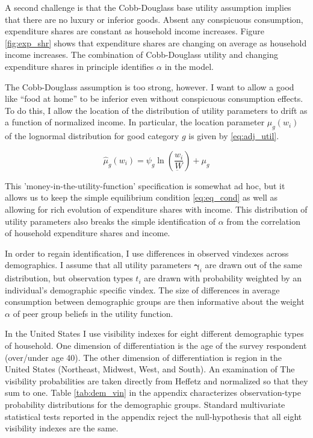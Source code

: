 \documentclass[11pt]{article}
\begin{document}
\begin{CJK}{UTF8}{gbsn}
A second challenge is that the Cobb-Douglass base utility assumption implies that there are no luxury or inferior goods.  Absent any conspicuous consumption, expenditure shares are constant as household  income increases.  Figure \ref{fig:exp_shr} shows that expenditure shares are changing on average as household income increases.  The combination of Cobb-Douglass utility and changing expenditure shares in principle identifies $\alpha$ in the model.

The Cobb-Douglass assumption is too strong, however.  I want to allow a good like ``food at home'' to be inferior even without conspicuous consumption effects.  To do this, I allow the location of the distribution of utility parameters to drift as a function of normalized income.  In particular, the location parameter $\hat{\mu}_g(w_i)$ of the lognormal distribution for good category $g$ is given by \eqref{eq:adj_util}.

\begin{equation}
    \label{eq:adj_util}
    \hat{\mu}_g(w_i) = \psi_g \ln \left(\frac{w_i}{\underbar{W}}\right) + \mu_g
\end{equation}

This 'money-in-the-utility-function' specification is somewhat ad hoc, but it allows us to keep the simple equilibrium condition \eqref{eq:eq_cond} as well as allowing for rich evolution of expenditure shares with income.  This distribution of utility parameters also breaks the simple identification of $\alpha$ from the correlation of household expenditure shares and income.

In order to regain identification, I use differences in observed vindexes across demographics.  I assume that all utility parameters $\boldsymbol{\gamma}_i$ are drawn out of the same distribution, but observation types $t_i$ are drawn with probability weighted by an individual's demographic specific vindex.  The size of differences in average consumption between demographic groups are then informative about the weight $\alpha$ of peer group beliefs in the utility function.

In the United States I use visibility indexes for eight different demographic types of household.  One dimension of differentiation is the age of the survey respondent (over/under age 40). The other dimension of differentiation is region in the United States (Northeast, Midwest, West, and South).  An examination of  The visibility probabilities are taken directly from Heffetz and normalized so that they sum to one.  Table \ref{tab:dem_vin} in the appendix characterizes observation-type probability distributions for the demographic groups.  Standard multivariate statistical tests reported in the appendix reject the null-hypothesis that all eight visibility indexes are the same.


\end{CJK}
\end{document}
